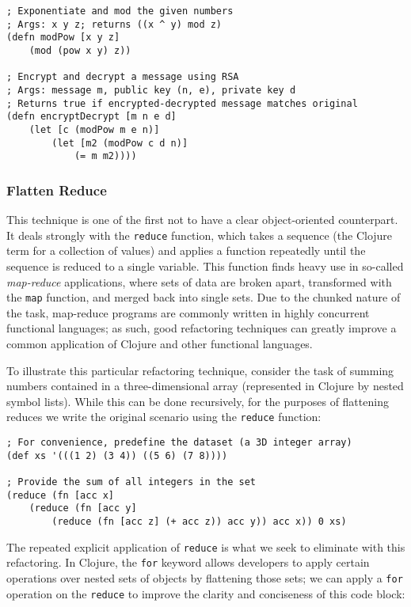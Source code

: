 \begin{verbatim}
; Exponentiate and mod the given numbers
; Args: x y z; returns ((x ^ y) mod z)
(defn modPow [x y z]
    (mod (pow x y) z))

; Encrypt and decrypt a message using RSA
; Args: message m, public key (n, e), private key d
; Returns true if encrypted-decrypted message matches original
(defn encryptDecrypt [m n e d]
    (let [c (modPow m e n)]
        (let [m2 (modPow c d n)]
            (= m m2))))
\end{verbatim}

\subsubsection{Flatten Reduce}

This technique is one of the first not to have a clear object-oriented counterpart. It deals strongly with the \verb!reduce! function, which takes a sequence (the Clojure term for a collection of values) and applies a function repeatedly until the sequence is reduced to a single variable. This function finds heavy use in so-called \textit{map-reduce} applications, where sets of data are broken apart, transformed with the \verb!map! function, and merged back into single sets. Due to the chunked nature of the task, map-reduce programs are commonly written in highly concurrent functional languages; as such, good refactoring techniques can greatly improve a common application of Clojure and other functional languages.

To illustrate this particular refactoring technique, consider the task of summing numbers contained in a three-dimensional array (represented in Clojure by nested symbol lists). While this can be done recursively, for the purposes of flattening reduces we write the original scenario using the \verb!reduce! function:

\begin{verbatim}
; For convenience, predefine the dataset (a 3D integer array)
(def xs '(((1 2) (3 4)) ((5 6) (7 8))))

; Provide the sum of all integers in the set
(reduce (fn [acc x]
    (reduce (fn [acc y]
        (reduce (fn [acc z] (+ acc z)) acc y)) acc x)) 0 xs)
\end{verbatim}

The repeated explicit application of \verb!reduce! is what we seek to eliminate with this refactoring. In Clojure, the \verb!for! keyword allows developers to apply certain operations over nested sets of objects by flattening those sets; we can apply a \verb!for! operation on the \verb!reduce! to improve the clarity and conciseness of this code block:

